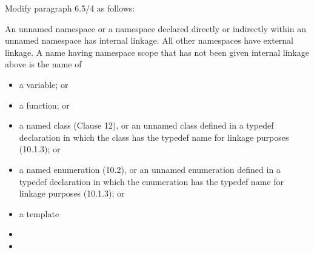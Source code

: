 \noindent
Modify paragraph 6.5/4 as follows:
\begin{std.txt}
  \resetalinea[3]
  \alinea
  An unnamed namespace or a namespace declared directly or 
  indirectly within an unnamed namespace has internal linkage. All other 
  namespaces have external linkage. 
  A name having namespace scope that has 
  not been given internal linkage above  is the name of
  \begin{itemize}
    \item a variable; or
    \item a function; or
    \item a named class (Clause 12), or an unnamed class defined in a 
    typedef declaration in which the class has the typedef name for 
    linkage purposes (10.1.3); or
    \item a named enumeration (10.2), or an unnamed enumeration defined in
    a typedef declaration in which the enumeration has the typedef name for
    linkage purposes (10.1.3); or
    \item a template
  \end{itemize}
  \color{addclr}
    \begin{itemize}
      \item {}
      \item {}
    \end{itemize}
\end{std.txt}


